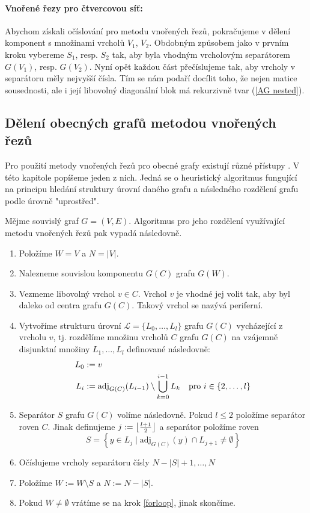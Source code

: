 \documentclass[11pt,american,czech,oneside]{book}
\theoremstyle{plain}
\theoremstyle{definition}
\DeclarePairedDelimiter\floor{\lfloor}{\rfloor}
\begin{document}
\paragraph{Vnořené řezy pro čtvercovou síť: }

Abychom získali očíslování pro metodu vnořených řezů, pokračujeme v dělení komponent s množinami vrcholů $V_1$, $V_2$. Obdobným způsobem jako v prvním kroku vybereme $S_1$, resp. $S_2$ tak, aby byla vhodným vrcholovým separátorem $G(V_1)$, resp. $G(V_2)$. Nyní opět každou část přečíslujeme tak, aby vrcholy v separátoru měly nejvyšší čísla.
Tím se nám podaří docílit toho, že nejen matice sousednosti, ale i její libovolný diagonální blok má rekurzivně tvar (\ref{AG nested}).

\subsection{Dělení obecných grafů metodou vnořených řezů}
\label{NDobecne}

Pro použití metody vnořených řezů pro obecné grafy existují různé přístupy \cite{litaro:79}. V této kapitole popíšeme jeden z nich. Jedná se o heuristický algoritmus fungující na principu hledání struktury úrovní daného grafu a následného rozdělení grafu podle úrovně "uprostřed".

Mějme souvislý graf $G=(V,E)$. Algoritmus pro jeho rozdělení využívající metodu vnořených řezů pak vypadá následovně.

\begin{enumerate}
  \item Položíme $W=V$ a $N=|V|$.
  \item \label{forloop} Nalezneme souvislou komponentu $G(C)$ grafu $G(W)$.
  \item Vezmeme libovolný vrchol $v\in C$. Vrchol $v$ je vhodné jej volit tak, aby byl daleko od centra grafu \cite{lew:82} $G(C)$. Takový vrchol se nazývá periferní.
  \item Vytvoříme strukturu úrovní $\mathcal{L}=\{L_0, \ldots ,L_l\}$ grafu $G(C)$ vycházející z vrcholu $v$, tj. rozdělíme množinu vrcholů $C$ grafu $G(C)$ na vzájemně disjunktní množiny $L_1, \ldots, L_l$ definované následovně:
      \begin{align*}
        L_0 & := v \\
        L_i & := \mathrm{adj}_{G(C)}(L_{i-1}) \setminus \bigcup_{k=0}^{i-1} L_k \quad {\rm pro} \ i \in \{2,\ldots,l\}
      \end{align*}
  \item Separátor $S$ grafu $G(C)$ volíme následovně. Pokud $l \leq 2$ položíme separátor roven $C$. Jinak definujeme $j := \floor*{\frac{l+1}{2}}$ a separátor položíme roven
      \[
        S = \left\{y \in L_j \mid \mathrm{adj}_{G(C)}(y) \cap L_{j+1} \neq \emptyset \right\}
      \]
  \item Očíslujeme vrcholy separátoru čísly $N-|S|+1,\ldots,N$
  \item Položíme $W:=W \setminus S$ a $N := N-|S|$.
  \item Pokud $W \neq \emptyset$ vrátíme se na krok \ref{forloop}, jinak skončíme.
\end{enumerate}
\end{document}
